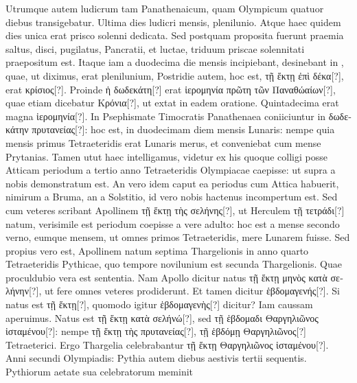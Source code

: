 Utrumque autem ludicrum tam Panathenaicum,
quam Olympicum quatuor diebus transigebatur.
Ultima dies ludicri
 mensis, plenilunio.
Atque haec quidem dies unica erat prisco solenni
dedicata.
Sed postquam proposita fuerunt praemia saltus, disci,
pugilatus, Pancratii, et luctae, triduum priscae solennitati praepositum
est.
Itaque iam a duodecima die mensis incipiebant, desinebant
in , quae, ut diximus, erat  plenilunium, Postridie autem, hoc
est, \textgreek{τῇ ἕκτῃ ἐπὶ δέκα[?]}, erat \textgreek{κρίσιος[?]}.
Proinde \textgreek{ἡ δωδεκάτη[?]} erat \textgreek{ἱερομηνία πρῶτη
τῶν Παναθώαίων[?]}, quae etiam dicebatur \textgreek{Κρόνια[?]},
 ut extat in eadem
oratione.
Quintadecima erat magna \textgreek{ἱερομηνία[?]}.
In Psephismate Timocratis
Panathenaea coniiciuntur in \textgreek{δωδεκάτην πρυτανείας[?]}: hoc est, in
duodecimam diem mensis Lunaris: nempe quia mensis primus Tetraeteridis
erat Lunaris merus, et conveniebat cum mense Prytanias.
Tamen utut haec intelligamus, videtur ex his quoque colligi posse
Atticam periodum a tertio anno Tetraeteridis Olympiacae caepisse:
ut supra a nobis demonstratum est.
An vero idem caput ea periodus
cum Attica habuerit, nimirum a Bruma, an a Solstitio, id vero nobis
hactenus incompertum est.
Sed cum veteres scribant Apollinem
\textgreek{τῇ ἕκτῃ τὴς σελήνης[?]}, ut Herculem \textgreek{τῇ τετράδι[?]} natum,
 verisimile est periodum
coepisse a vere adulto: hoc est a mense secondo verno, eumque
mensem, ut omnes primos Tetraeteridis, mere Lunarem fuisse.
Sed propius vero est, Apollinem natum septima Thargelionis in anno
quarto Tetraeteridis Pythicae, quo tempore novilunium est secunda
Thargelionis.
Quae proculdubio vera est sententia.
Nam Apollo dicitur
natus \textgreek{τῇ ἕκτῃ μηνὸς κατὰ σελήνην[?]},
 ut fere omnes veteres prodiderunt.
Et tamen dicitur \textgreek{ἑβδομαγενής[?]}.
Si natus est \textgreek{τῇ ἕκτῃ[?]},
 quomodo igitur \textgreek{ἑβδομαγενὴς[?]}
dicitur?
Iam caussam aperuimus.
Natus est \textgreek{τῇ ἕκτῃ κατὰ σελήνώ[?]},
sed \textgreek{τῇ ἑβδομαδι Θαργηλιῶνος ἱσταμένου[?]}:
 nempe \textgreek{τῇ ἕκτῃ τὴς πρυτανείας[?]},
\textgreek{τῇ ἑβδόμῃ Θαργηλιῶνος[?]} Tetraeterici.
Ergo Thargelia celebrabantur
\textgreek{τῇ ἕκτῃ Θαργηλιῶνος ἱσταμένου[?]}.
Anni secundi Olympiadis: Pythia autem
diebus aestivis tertii sequentis.
Pythiorum aetate sua celebratorum meminit
